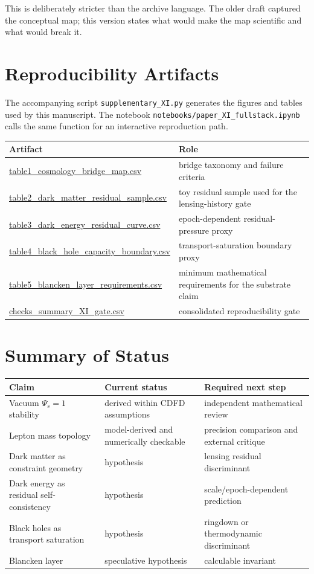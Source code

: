 \documentclass[11pt]{article}
\begin{document}
This is deliberately stricter than the archive language. The older draft
captured the conceptual map; this version states what would make the map
scientific and what would break it.

\section{Reproducibility Artifacts}

The accompanying script \texttt{supplementary\_XI.py} generates the figures
and tables used by this manuscript. The notebook
\texttt{notebooks/paper\_XI\_fullstack.ipynb} calls the same function for an
interactive reproduction path.

\begin{center}
\small
\begin{tabular}{p{}p{}}
\toprule
\textbf{Artifact} & \textbf{Role}\\
\midrule
\url{table1_cosmology_bridge_map.csv} & bridge taxonomy and failure criteria\\
\url{table2_dark_matter_residual_sample.csv} & toy residual sample used for the lensing-history gate\\
\url{table3_dark_energy_residual_curve.csv} & epoch-dependent residual-pressure proxy\\
\url{table4_black_hole_capacity_boundary.csv} & transport-saturation boundary proxy\\
\url{table5_blancken_layer_requirements.csv} & minimum mathematical requirements for the substrate claim\\
\url{checks_summary_XI_gate.csv} & consolidated reproducibility gate\\
\bottomrule
\end{tabular}
\end{center}

\section{Summary of Status}

\begin{center}
\begin{tabular}{p{}p{}p{}}
\toprule
\textbf{Claim} & \textbf{Current status} & \textbf{Required next step}\\
\midrule
Vacuum $\Psi_s=1$ stability & derived within CDFD assumptions & independent mathematical review\\
Lepton mass topology & model-derived and numerically checkable & precision comparison and external critique\\
Dark matter as constraint geometry & hypothesis & lensing residual discriminant\\
Dark energy as residual self-consistency & hypothesis & scale/epoch-dependent prediction\\
Black holes as transport saturation & hypothesis & ringdown or thermodynamic discriminant\\
Blancken layer & speculative hypothesis & calculable invariant\\
\bottomrule
\end{tabular}
\end{center}
\end{document}
